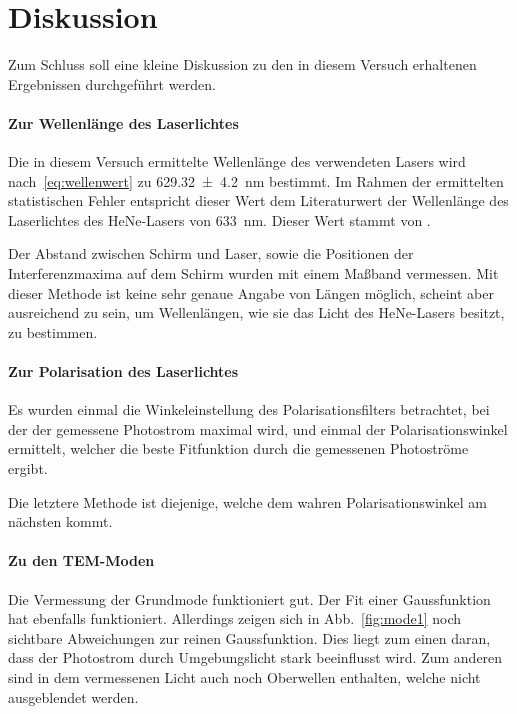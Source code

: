 
\section{Diskussion}
Zum Schluss soll eine kleine Diskussion zu den in diesem Versuch
erhaltenen Ergebnissen durchgeführt werden.

\paragraph{Zur Wellenlänge des Laserlichtes}

Die in diesem Versuch ermittelte Wellenlänge des verwendeten 
Lasers wird nach~\eqref{eq:wellenwert} zu  
\SI{629.32(420)}{\nano\metre} bestimmt. Im Rahmen der 
ermittelten statistischen Fehler entspricht dieser Wert dem 
Literaturwert der Wellenlänge des Laserlichtes des HeNe-Lasers 
von \SI{633}{\nano\metre}. Dieser Wert stammt von \cite{nistlaser}.

Der Abstand zwischen Schirm und Laser, sowie die Positionen der 
Interferenzmaxima auf dem Schirm wurden mit einem Maßband 
vermessen. Mit dieser Methode ist keine sehr genaue Angabe von 
Längen möglich, scheint aber ausreichend zu sein, um Wellenlängen, 
wie sie das Licht des HeNe-Lasers besitzt, zu bestimmen.

\paragraph{Zur Polarisation des Laserlichtes}

Es wurden einmal die Winkeleinstellung des Polarisationsfilters 
betrachtet, bei der der gemessene Photostrom maximal wird, 
und einmal der Polarisationswinkel ermittelt, welcher die beste 
Fitfunktion durch die gemessenen Photoströme ergibt. 

Die letztere Methode ist diejenige, welche dem wahren 
Polarisationswinkel am nächsten kommt. 

\paragraph{Zu den TEM-Moden}

Die Vermessung der Grundmode funktioniert gut. 
Der Fit einer Gaussfunktion hat ebenfalls funktioniert. 
Allerdings zeigen sich in Abb.~\ref{fig:mode1} noch 
sichtbare Abweichungen zur reinen Gaussfunktion. 
Dies liegt zum einen daran, dass der Photostrom durch 
Umgebungslicht stark beeinflusst wird.
Zum anderen sind in dem vermessenen Licht auch noch 
Oberwellen enthalten, welche nicht ausgeblendet werden. 

